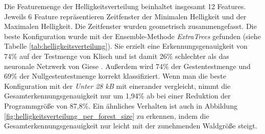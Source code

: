 Die Featuremenge der Helligkeitsverteilung beinhaltet insgesamt 12 Features. Jeweils 6 Feature repräsentieren Zeitfenster der Minimalen Helligkeit und der Maximalen Helligkeit. Die Zeitfenster wurden
geometrisch zusammengefasst.
\newline
\newline
Die beste Konfiguration wurde mit der Ensemble-Methode \textit{ExtraTrees} gefunden (siehe Tabelle \ref{tab:helligkeitsverteilung}). Sie erzielt eine Erkennungsgenauigkeit von 74\% auf der Testmenge von Klisch
und ist damit 26\% schlechter als das neuronale Netzwerk von Giese \cite{gieseThesis}. Außerdem wird 74\% der Gestentestmenge und 69\% der Nullgestentestmenge korrekt klassifiziert.
\newline
\newline
Wenn man die beste Konfiguration mit der \textit{Unter 28 kB} mit einerander vergleicht, nimmt die Gesamterkennungsgenauigkeit nur um 1,94\% ab bei einer Reduktion der Programmgröße von 87,8\%.
Ein ähnliches Verhalten ist auch in Abbildung \ref{fig:helligkeitsverteilung_per_forest_size} zu erkennen, indem die Gesamterkennungsgenauigkeit nur leicht mit der zunehmenden Waldgröße steigt.